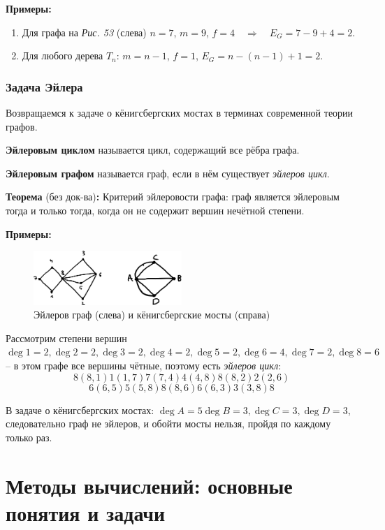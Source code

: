 \documentclass[12pt, a4paper]{article}
\begin{document}
\textbf{Примеры:}
\begin{enumerate}
\item Для графа на \textit{Рис. 53} (слева) $n = 7$, $m = 9$, $f = 4 \quad \Rightarrow \quad  E_G = 7-9+4 = 2$.
\item Для любого дерева $T_n$: $m=n-1$, $f=1$, $E_G=n-(n-1)+1=2$.
\end{enumerate}

\subsubsection{Задача Эйлера}

Возвращаемся к задаче о кёнигсбергских мостах в терминах современной теории графов.

\textbf{Эйлеровым циклом} называется цикл, содержащий все рёбра графа.

\textbf{Эйлеровым графом} называется граф, если в нём существует \textit{эйлеров цикл}.

\textbf{Теорема} (без док-ва)\textbf{:} Критерий эйлеровости графа: граф является эйлеровым тогда и только тогда, когда он не содержит вершин нечётной степени.

\newpage

\textbf{Примеры:}

\begin{figure}[h]
 \centering
 \includegraphics[width=0.5\textwidth]{53}
 \vspace{-4mm}
 \caption{Эйлеров граф (слева) и кёнигсбергские мосты (справа)}
\end{figure}

Рассмотрим степени вершин $\deg 1=2, \deg 2=2, \deg 3=2, \deg 4=2, \deg 5=2, \deg 6=4, \deg 7=2, \deg 8=6$ -- в этом графе все вершины чётные, поэтому есть \textit{эйлеров цикл}:
\[8(8,1)1(1,7)7(7,4)4(4,8)8(8,2)2(2,6) \]
\[6(6,5)5(5,8)8(8,6)6(6,3)3(3,8)8 \]

В задаче о кёнигсбергских мостах: $\deg A=5 \deg B=3, \deg C=3, \deg D=3$, следовательно граф не эйлеров, и обойти мосты нельзя, пройдя по каждому только раз.

\section{Методы вычислений: основные понятия и задачи}
\end{document}
